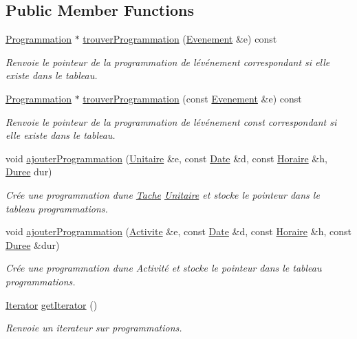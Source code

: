 \subsection*{Public Member Functions}
\begin{DoxyCompactItemize}
\item 
\hyperlink{class_programmation}{Programmation} $\ast$ \hyperlink{class_programmation_manager_a43fd958e37bf4a78b845006aa5551bec}{trouver\+Programmation} (\hyperlink{class_evenement}{Evenement} \&e) const 
\begin{DoxyCompactList}\small\item\em Renvoie le pointeur de la programmation de l\textquotesingle{}événement correspondant si elle existe dans le tableau. \end{DoxyCompactList}\item 
\hyperlink{class_programmation}{Programmation} $\ast$ \hyperlink{class_programmation_manager_ab52ba49ca1d79add9f6d83f8f9386b7e}{trouver\+Programmation} (const \hyperlink{class_evenement}{Evenement} \&e) const 
\begin{DoxyCompactList}\small\item\em Renvoie le pointeur de la programmation de l\textquotesingle{}événement const correspondant si elle existe dans le tableau. \end{DoxyCompactList}\item 
void \hyperlink{class_programmation_manager_a8b6067aba53b0389d30c485c9a544769}{ajouter\+Programmation} (\hyperlink{class_unitaire}{Unitaire} \&e, const \hyperlink{class_t_i_m_e_1_1_date}{Date} \&d, const \hyperlink{class_t_i_m_e_1_1_horaire}{Horaire} \&h, \hyperlink{class_t_i_m_e_1_1_duree}{Duree} dur)
\begin{DoxyCompactList}\small\item\em Crée une programmation d\textquotesingle{}une \hyperlink{class_tache}{Tache} \hyperlink{class_unitaire}{Unitaire} et stocke le pointeur dans le tableau programmations. \end{DoxyCompactList}\item 
void \hyperlink{class_programmation_manager_a3451eabd67b35163c6213eed9b2f3733}{ajouter\+Programmation} (\hyperlink{class_activite}{Activite} \&e, const \hyperlink{class_t_i_m_e_1_1_date}{Date} \&d, const \hyperlink{class_t_i_m_e_1_1_horaire}{Horaire} \&h, const \hyperlink{class_t_i_m_e_1_1_duree}{Duree} \&dur)
\begin{DoxyCompactList}\small\item\em Crée une programmation d\textquotesingle{}une Activité et stocke le pointeur dans le tableau programmations. \end{DoxyCompactList}\item 
\hyperlink{class_programmation_manager_1_1_iterator}{Iterator} \hyperlink{class_programmation_manager_aaff6e0852f9e7ec4aeb47f6ef976fdf9}{get\+Iterator} ()
\begin{DoxyCompactList}\small\item\em Renvoie un iterateur sur programmations. \end{DoxyCompactList}\end{DoxyCompactItemize}
